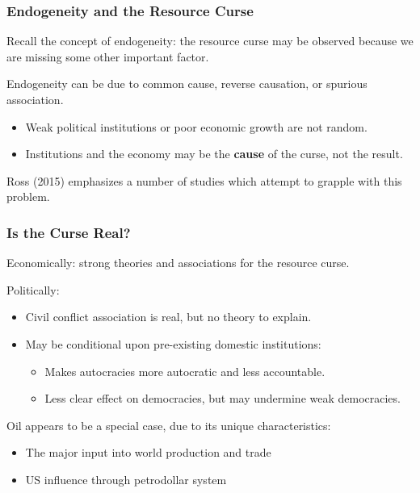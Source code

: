 \documentclass[handout]{beamer}
\begin{document}
\begin{frame} 
	\frametitle{\LARGE{Endogeneity and the Resource Curse}}
	\begin{itemize}
		\large{
			\item Recall the concept of endogeneity: the resource curse may be observed because we are missing some other important factor.
			\item Endogeneity can be due to common cause, reverse causation, or spurious association.
			\begin{itemize}
				\item Weak political institutions or poor economic growth are not random. \pause 
				\item Institutions and the economy may be the \textbf{cause} of the curse, not the result. \pause 
			\end{itemize}
			\item Ross (2015) emphasizes a number of studies which attempt to grapple with this problem.   
			
		}
	\end{itemize}
\end{frame}

\begin{frame} 
	\frametitle{\LARGE{Is the Curse Real?}}
	\begin{itemize}
		\large{ 
			\item Economically: strong theories and associations for the resource curse. \pause
			
			\item Politically: \pause
			\begin{itemize}
				\item Civil conflict association is real, but no theory to explain. \pause
				\item May be conditional upon pre-existing domestic institutions: \pause
				\begin{itemize}
					\item Makes autocracies more autocratic and less accountable. \pause
					\item Less clear effect on democracies, but may undermine weak democracies. \pause
				\end{itemize}
				
			\end{itemize}
			\item Oil appears to be a special case, due to its unique characteristics: \pause
			\begin{itemize}
				\item The major input into world production and trade\pause
				\item US influence through petrodollar system 
			\end{itemize}
		}
	\end{itemize}
\end{frame}
\end{document}

